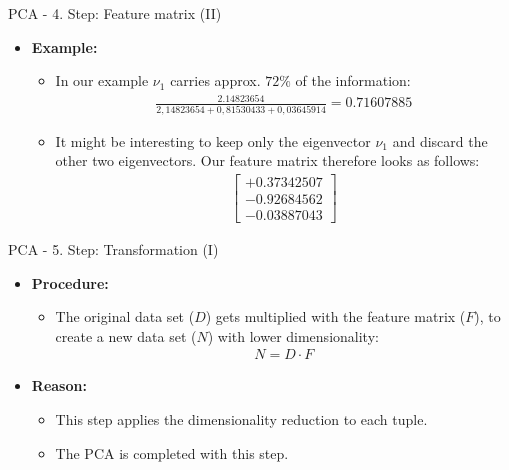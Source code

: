 \begin{frame}{PCA - 4. Step: Feature matrix (II)}
	\begin{itemize}
		\item \textbf{Example:}
		      \begin{itemize}
			      \item In our example $\nu_1$ carries approx. $72\%$ of the
			            information: \\
			            \begin{align*}
				            \frac{2.14823654}{2,14823654+0,81530433+0,03645914} = 0.71607885
			            \end{align*}
			      \item It might be interesting to keep only the eigenvector $\nu_1$
			            and discard the other two eigenvectors. Our feature matrix
			            therefore looks as follows:
			            \begin{align*}
				            \begin{bmatrix} +0.37342507 \\ -0.92684562 \\ -0.03887043 \end{bmatrix}
			            \end{align*}
		      \end{itemize}
	\end{itemize}
\end{frame}

\begin{frame}{PCA - 5. Step: Transformation (I)}
	\begin{itemize}
		\item \textbf{Procedure:}
		      \begin{itemize}
			      \item The original data set ($D$) gets multiplied with the feature
			            matrix ($F$), to create a new data set ($N$) with lower
			            dimensionality:
			            \begin{align*}
				            N = D \cdot F
			            \end{align*}
		      \end{itemize}
		\item \textbf{Reason:}
		      \begin{itemize}
			      \item This step applies the dimensionality reduction to each tuple.
			      \item The PCA is completed with this step.
		      \end{itemize}
	\end{itemize}
\end{frame}

